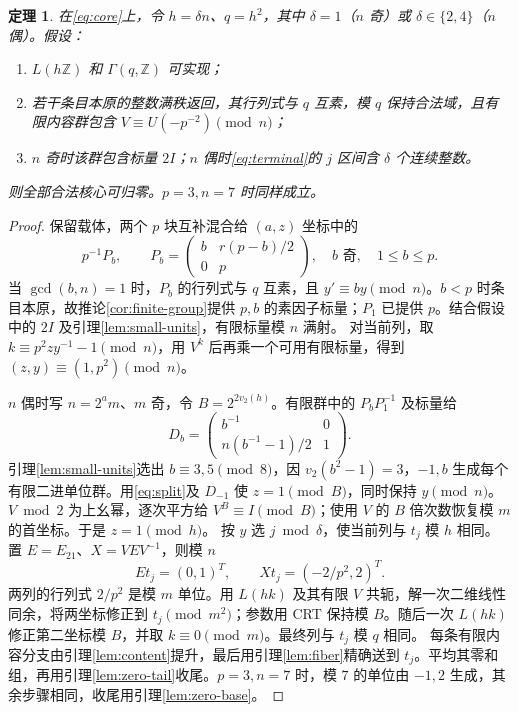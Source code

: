 \documentclass[11pt,a4paper]{article}
\newcommand{\Z}{\mathbb Z}
\newtheorem{theorem}{定理}[section]
\theoremstyle{definition}
\numberwithin{equation}{section}
\begin{document}
\begin{theorem}\label{thm:terminal}
在\eqref{eq:core}上，令 $h=\delta n$、$q=h^2$，其中 $\delta=1$（$n$ 奇）或 $\delta\in\{2,4\}$（$n$ 偶）。假设：
\begin{enumerate}
\item $L(h\Z)$ 和 $\Gamma(q,\Z)$ 可实现；
\item 若干条目本原的整数满秩返回，其行列式与 $q$ 互素，模 $q$ 保持合法域，且有限内容群包含 $V\equiv U(-p^{-2})\pmod n$；
\item $n$ 奇时该群包含标量 $2I$；$n$ 偶时\eqref{eq:terminal}的 $j$ 区间含 $\delta$ 个连续整数。
\end{enumerate}
则全部合法核心可归零。$p=3,n=7$ 时同样成立。
\end{theorem}
\begin{proof}
保留载体，两个 $p$ 块互补混合给 $(a,z)$ 坐标中的
\[
p^{-1}P_b,\qquad P_b=\begin{pmatrix}b&r(p-b)/2\\0&p\end{pmatrix},
\quad b\text{ 奇},\quad1\le b\le p.
\]
当 $\gcd(b,n)=1$ 时，$P_b$ 的行列式与 $q$ 互素，且 $y'\equiv by\pmod n$。$b<p$ 时条目本原，故推论\ref{cor:finite-group}提供 $p,b$ 的素因子标量；$P_1$ 已提供 $p$。结合假设中的 $2I$ 及引理\ref{lem:small-units}，有限标量模 $n$ 满射。
对当前列，取 $k\equiv p^2zy^{-1}-1\pmod n$，用 $V^k$ 后再乘一个可用有限标量，得到 $(z,y)\equiv(1,p^2)\pmod n$。

$n$ 偶时写 $n=2^a m$、$m$ 奇，令 $B=2^{2v_2(h)}$。有限群中的 $P_bP_1^{-1}$ 及标量给
\begin{equation}\label{eq:split}
D_b=\begin{pmatrix}b^{-1}&0\\n(b^{-1}-1)/2&1\end{pmatrix}.
\end{equation}
引理\ref{lem:small-units}选出 $b\equiv3,5\pmod8$，因 $v_2(b^2-1)=3$，$-1,b$ 生成每个有限二进单位群。用\eqref{eq:split}及 $D_{-1}$ 使 $z=1\pmod B$，同时保持 $y\pmod n$。$V\bmod2$ 为上幺幂，逐次平方给 $V^B\equiv I\pmod B$；使用 $V$ 的 $B$ 倍次数恢复模 $m$ 的首坐标。于是 $z=1\pmod h$。
按 $y$ 选 $j\bmod\delta$，使当前列与 $t_j$ 模 $h$ 相同。置 $E=E_{21}$、$X=VEV^{-1}$，则模 $n$
\[
Et_j=(0,1)^T,\qquad Xt_j=(-2/p^2,2)^T.
\]
两列的行列式 $2/p^2$ 是模 $m$ 单位。用 $L(hk)$ 及其有限 $V$ 共轭，解一次二维线性同余，将两坐标修正到 $t_j\pmod{m^2}$；参数用 CRT 保持模 $B$。随后一次 $L(hk)$ 修正第二坐标模 $B$，并取 $k\equiv0\pmod m$。最终列与 $t_j$ 模 $q$ 相同。
每条有限内容分支由引理\ref{lem:content}提升，最后用引理\ref{lem:fiber}精确送到 $t_j$。平均其零和组，再用引理\ref{lem:zero-tail}收尾。$p=3,n=7$ 时，模 $7$ 的单位由 $-1,2$ 生成，其余步骤相同，收尾用引理\ref{lem:zero-base}。
\end{proof}
\end{document}
